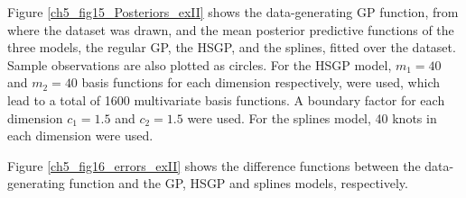 \documentclass[onecolumn,a4paper,11pt]{article}
\begin{document}
Figure \ref{ch5_fig15_Posteriors_exII} shows the data-generating GP function, from where the dataset was drawn, and the mean posterior predictive functions of the three models, the regular GP, the HSGP, and the splines, fitted over the dataset. Sample observations are also plotted as circles. For the HSGP model, $m_1=40$ and $m_2=40$ basis functions for each dimension respectively, were used, which lead to a total of 1600 multivariate basis functions. A boundary factor for each dimension $c_1=1.5$ and $c_2=1.5$ were used. For the splines model, 40 knots in each dimension were used.

Figure \ref{ch5_fig16_errors_exII} shows the difference functions between the data-generating function and the GP, HSGP and splines models, respectively.

\begin{figure}
\begin{center}
\begin{tabular}{ c c c}

\end{tabular}
\end{center}
\end{figure}
\end{document}
